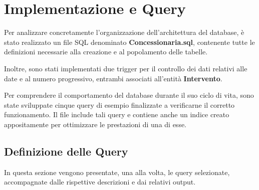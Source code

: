 \vspace{0.5cm}
\section{Implementazione e Query}

Per analizzare concretamente l'organizzazione dell’architettura del database, è stato realizzato un file SQL denominato \textbf{Concessionaria.sql}, contenente tutte le definizioni necessarie alla creazione e al popolamento delle tabelle.

Inoltre, sono stati implementati due trigger per il controllo dei dati relativi alle date e al numero progressivo, entrambi associati all’entità \textbf{Intervento}.

Per comprendere il comportamento del database durante il suo ciclo di vita, sono state sviluppate cinque query di esempio finalizzate a verificarne il corretto funzionamento. Il file include tali query e contiene anche un indice creato appositamente per ottimizzare le prestazioni di una di esse.

\subsection{Definizione delle Query}
In questa sezione vengono presentate, una alla volta, le query selezionate, accompagnate dalle rispettive descrizioni e dai relativi output.

